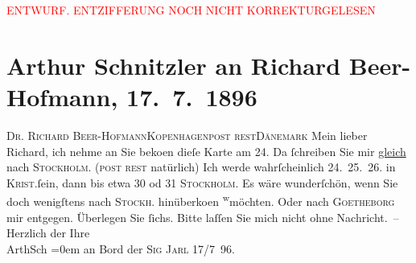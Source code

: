 
\begin{center}
            \textcolor{red}{ENTWURF. ENTZIFFERUNG NOCH NICHT KORREKTURGELESEN}
                      \end{center}
            
               \section[Arthur Schnitzler an Richard Beer-Hofmann, 17. 7. 1896]{ Arthur Schnitzler an Richard Beer-Hofmann,
               17. 7. 1896}\nopagebreak{}\rehead{ }\begin{ledgroupsized}[t]{13cm}\normalsize\beginnumbering{} \toendnotes[C]{\smallbreak\pagebreak[2]} 
\pstart{}{\pb}\textsc{Dr. Richard
                     Beer-Hofmann}\pend{}\pstart{}\textsc{Kopenhagen}\pend{}\pstart{}\textsc{post rest}\pend{}\pstart{}\textsc{Dänemark}\pend{}{\bigskip}\pstart
           \noindent{}{\pb}Mein lieber Richard, ich
               nehme an Sie beko{\geminationm}en dieſe Karte am 24. Da
               ſchreiben Sie mir \uline{gleich} nach \textsc{Stockholm}. (\textsc{post rest} natürlich) Ich werde wahrſcheinlich
                  24. 25. 26. in \textsc{Krist.}ſein, dann bis etwa
                  30 od 31{ }\textsc{Stockholm}. Es wäre
               wunderſchön, wenn Sie doch wenigſtens nach \textsc{Stockh}. hinüberko{\geminationm}en \substVorne{}\textsuperscript{w}\substDazwischen{}mö\substHinten{}chten. Oder nach \textsc{Goetheborg} mir entgegen. Überlegen Sie ſichs. Bitte laſſen
               Sie mich nicht ohne Nachricht. –\pend
           \pstart
           Herzlich der Ihre{\\[\baselineskip]}\spacefill\mbox{ArthSch}\pend
           \leftskip=0em{}\pstart
           \noindent{}an Bord der \textsc{Sig Jarl}{ }17/7 96.\pend
           \endnumbering{}\end{ledgroupsized}  \newcommand{\dateiname}{L00565}\newcommand{\titel}{Arthur Schnitzler an Richard Beer-Hofmann, 17. 7. 1896}\newcommand{\editorInnen}{Martin Anton Müller und Gerd-Hermann Susen}
      